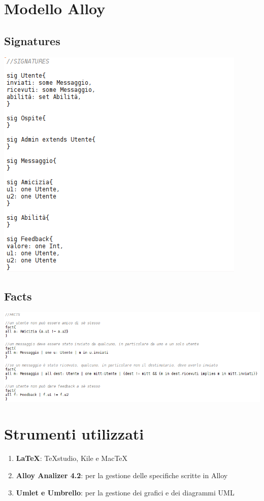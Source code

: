 \documentclass[a4paper,12pt]{article}
\begin{document}
\section{Modello Alloy}
\subsection{Signatures}
\includegraphics[scale=0.6]{signatures.png}
\subsection{Facts}
\includegraphics[scale=0.6]{facts.png} \\
\clearpage
\section{Strumenti utilizzati}
\begin{enumerate}
\itemsep0em
\item \textbf{\LaTeX}: TeXstudio, Kile e MacTeX
\item \textbf{Alloy Analizer 4.2}: per la gestione delle specifiche scritte in Alloy
\item \textbf{Umlet e Umbrello}: per la gestione dei grafici e dei diagrammi UML
\end{enumerate}
\end{document}
